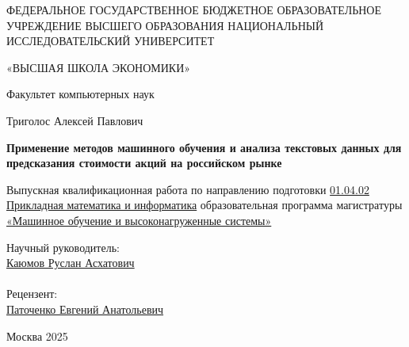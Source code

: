 \documentclass[12pt, a4paper]{article}
\begin{document}
\begin{titlepage}
    \begin{center}
     ФЕДЕРАЛЬНОЕ ГОСУДАРСТВЕННОЕ БЮДЖЕТНОЕ
ОБРАЗОВАТЕЛЬНОЕ УЧРЕЖДЕНИЕ ВЫСШЕГО ОБРАЗОВАНИЯ
НАЦИОНАЛЬНЫЙ ИССЛЕДОВАТЕЛЬСКИЙ УНИВЕРСИТЕТ

«ВЫСШАЯ ШКОЛА ЭКОНОМИКИ»

    \vspace{0.5cm}
    Факультет компьютерных наук
    \vspace{6em}

     Триголос Алексей Павлович
    \end{center}

    \begin{center}
    \textbf{Применение методов машинного обучения и анализа текстовых данных для предсказания стоимости акций на российском рынке}
    \end{center}

    \vspace{1em}

    \begin{center}
     Выпускная квалификационная работа по направлению подготовки \underline{01.04.02 Прикладная математика и информатика} образовательная программа магистратуры \underline{«Машинное обучение и высоконагруженные системы»}
     \end{center}
    \vspace{3em}

    \begin{flushright}
    Научный руководитель:\\
    \underline{Каюмов Руслан Асхатович}\\
    \>\\
    Рецензент:\\
    \underline{Паточенко Евгений Анатольевич}\\
    \end{flushright}

    \vspace{\fill}

    \begin{center}
    Москва 2025
    \end{center}

    \end{titlepage}
\setcounter{page}{2}
\begin{center}
\tableofcontents
\end{center}
\end{document}
